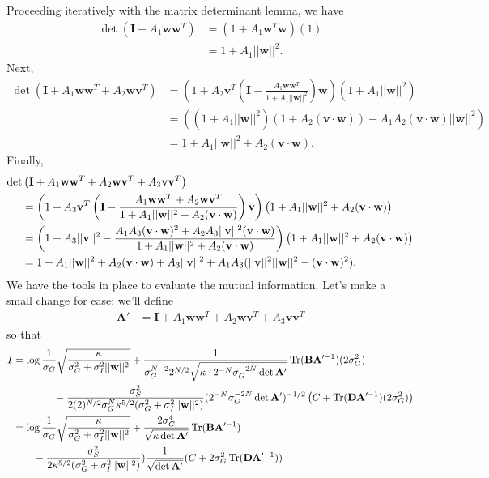 \documentclass[11pt]{article}
\DeclareMathOperator{\Tr}{Tr}
\begin{document}
Proceeding iteratively with the matrix determinant lemma, we have
\begin{align}
	\det (\mathbf{I} + A_1 \mathbf{ww}^T) &= (1 + A_1 \mathbf{w}^T \mathbf{w}) (1) \\
	&= 1  + A_1 ||\mathbf{w}||^2.
\end{align}
Next,
\begin{align}
	\det (\mathbf{I} + A_1 \mathbf{ww}^T + A_2 \mathbf{wv}^T) &= \left(1 + A_2\mathbf{v}^T  \left( \mathbf{I} - \frac{A_1 \mathbf{ww}^T}{1 + A_1 ||\mathbf{w}||^2}\right) \mathbf{w}\right) (1 + A_1 ||\mathbf{w}||^2) \\
	&= \left((1  +A_1 ||\mathbf{w}||^2)(1 + A_2 (\mathbf{v}\cdot\mathbf{w})) - A_1 A_2 (\mathbf{v}\cdot\mathbf{w}) ||\mathbf{w}||^2\right) \\
	&= 1 + A_1 ||\mathbf{w}||^2 + A_2 (\mathbf{v}\cdot\mathbf{w}).
\end{align}
Finally,
\begin{align}
	\det &\left(\mathbf{I}+ A_1 \mathbf{ww}^T + A_2 \mathbf{wv}^T + A_3 \mathbf{vv}^T\right) \notag \\
	&=\left(1 + A_3 \mathbf{v}^T \left(\mathbf{I} - \frac{A_1 \mathbf{ww}^T + A_2 \mathbf{wv}^T}{1 + A_1 ||\mathbf{w}||^2 + A_2 (\mathbf{v}\cdot\mathbf{w})}\right)\mathbf{v}\right)\left(1 + A_1 ||\mathbf{w}||^2 + A_2 (\mathbf{v}\cdot\mathbf{w})\right) \\
	& =\left(1 + A_3 ||\mathbf{v}||^2 - \frac{A_1 A_3 (\mathbf{v}\cdot\mathbf{w})^2 + A_2 A_3 ||\mathbf{v}||^2 (\mathbf{v}\cdot\mathbf{w})}{1 + A_1 ||\mathbf{w}||^2 + A_2 (\mathbf{v}\cdot\mathbf{w})}\right)\left(1 + A_1 ||\mathbf{w}||^2 + A_2 (\mathbf{v}\cdot\mathbf{w})\right)\\
	&= 1 + A_1 ||\mathbf{w}||^2 + A_2 (\mathbf{v}\cdot\mathbf{w}) + A_3 ||\mathbf{v}||^2 + A_1 A_3 (||\mathbf{v}||^2 ||\mathbf{w}||^2 - (\mathbf{v}\cdot\mathbf{w})^2).
\end{align}
We have the tools in place to evaluate the mutual information. Let's make a small change for ease: we'll define
\begin{align}
	\mathbf{A}' &= \mathbf{I} + A_1 \mathbf{ww}^T + A_2 \mathbf{wv}^T + A_3 \mathbf{vv}^T
\end{align}
so that
\begin{align}
	I &= \log \frac{1}{\sigma_G} \sqrt{\frac{\kappa}{\sigma_G^2 + \sigma_I^2 ||\mathbf{w}||^2}} +\frac{1}{\sigma_G^{N-2} 2^{N/2} \sqrt{\kappa  \cdot 2^{-N} \sigma_G^{-2N}\det \mathbf{A}'}}\Tr(\mathbf{B} \mathbf{A}'^{-1}) (2\sigma_G^2) \notag \\
	&\qquad \qquad -\frac{\sigma_S^2}{2(2)^{N/2} \sigma_G^N \kappa^{5/2} (\sigma_G^2 + \sigma_I^2 ||\mathbf{w}||^2)}(2^{-N}\sigma_G^{-2N}\det \mathbf{A}')^{-1/2} \left(C + \Tr (\mathbf{D}\mathbf{A}'^{-1}) (2\sigma_G^2)\right) \\
	&= \log \frac{1}{\sigma_G} \sqrt{\frac{\kappa}{\sigma_G^2 + \sigma_I^2 ||\mathbf{w}||^2}} + \frac{2\sigma_G^4}{\sqrt{\kappa \det \mathbf{A}'}}\Tr (\mathbf{B} \mathbf{A}'^{-1}) \notag \\
	&\qquad -\frac{\sigma_S^2}{2\kappa^{5/2} (\sigma_G^2 + \sigma_I^2 ||\mathbf{w}||^2)}) \frac{1}{\sqrt{\det \mathbf{A}'}} (C + 2\sigma_G^2 \Tr (\mathbf{D}\mathbf{A}'^{-1}))
\end{align}
\end{document}
